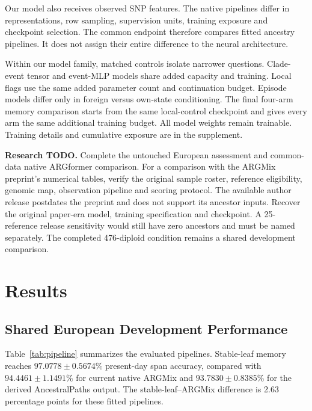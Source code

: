 \documentclass[letterpaper]{article}
\newcommand{\todo}[1]{\par\noindent\textbf{Research TODO.} #1\par}
\begin{document}
Our model also receives observed SNP features. The native pipelines differ in representations, row sampling, supervision units, training exposure and checkpoint selection. The common endpoint therefore compares fitted ancestry pipelines. It does not assign their entire difference to the neural architecture.

Within our model family, matched controls isolate narrower questions. Clade-event tensor and event-MLP models share added capacity and training. Local flags use the same added parameter count and continuation budget. Episode models differ only in foreign versus own-state conditioning. The final four-arm memory comparison starts from the same local-control checkpoint and gives every arm the same additional training budget. All model weights remain trainable. Training details and cumulative exposure are in the supplement.

\todo{Complete the untouched European assessment and common-data native ARGformer comparison. For a comparison with the ARGMix preprint's numerical tables, verify the original sample roster, reference eligibility, genomic map, observation pipeline and scoring protocol. The available author release postdates the preprint and does not support its ancestor inputs. Recover the original paper-era model, training specification and checkpoint. A 25-reference release sensitivity would still have zero ancestors and must be named separately. The completed 476-diploid condition remains a shared development comparison.}

\section{Results}
\subsection{Shared European Development Performance}
Table~\ref{tab:pipeline} summarizes the evaluated pipelines. Stable-leaf memory reaches $97.0778\pm0.5674\%$ present-day span accuracy, compared with $94.4461\pm1.1491\%$ for current native ARGMix and $93.7830\pm0.8385\%$ for the derived AncestralPaths output. The stable-leaf--ARGMix difference is 2.63 percentage points for these fitted pipelines.
\end{document}
